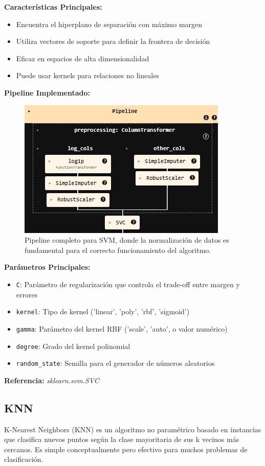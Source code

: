 \documentclass{article}
\begin{document}
\textbf{Características Principales:}
\begin{itemize}
    \item Encuentra el hiperplano de separación con máximo margen
    \item Utiliza vectores de soporte para definir la frontera de decisión
    \item Eficaz en espacios de alta dimensionalidad
    \item Puede usar kernels para relaciones no lineales
\end{itemize}

\textbf{Pipeline Implementado:}
\begin{figure}[H]
    \centering
    \includegraphics[width=0.4\linewidth]{pipeline_svm.png}
    \caption{Pipeline completo para SVM, donde la normalización de datos es fundamental para el correcto funcionamiento del algoritmo.}
    \label{fig:pipeline_svm}
\end{figure}

\textbf{Parámetros Principales:}
\begin{itemize}
    \item \texttt{C}: Parámetro de regularización que controla el trade-off entre margen y errores
    \item \texttt{kernel}: Tipo de kernel ('linear', 'poly', 'rbf', 'sigmoid')
    \item \texttt{gamma}: Parámetro del kernel RBF ('scale', 'auto', o valor numérico)
    \item \texttt{degree}: Grado del kernel polinomial
        \item \texttt{random\_state}: Semilla para el generador de números aleatorios
\end{itemize}

\textbf{Referencia:} \textit{sklearn.svm.SVC} \cite{sklearn_svm}

\subsection{KNN}

K-Nearest Neighbors (KNN) es un algoritmo no paramétrico basado en instancias que clasifica nuevos puntos según la clase mayoritaria de sus k vecinos más cercanos. Es simple conceptualmente pero efectivo para muchos problemas de clasificación.
\end{document}
